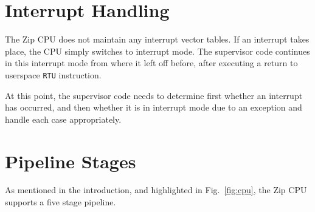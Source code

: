 \documentclass{gqtekspec}
\begin{document}
\section{Interrupt Handling}
The Zip CPU does not maintain any interrupt vector tables.  If an interrupt
takes place, the CPU simply switches to interrupt mode.  The supervisor code
continues in this interrupt mode from where it left off before, after 
executing a return to userspace {\tt RTU} instruction.

At this point, the supervisor code needs to determine first whether an 
interrupt has occurred, and then whether it is in interrupt mode due to 
an exception and handle each case appropriately.

\section{Pipeline Stages}
As mentioned in the introduction, and highlighted in Fig.~\ref{fig:cpu},
the Zip CPU supports a five stage pipeline.
\end{document}
